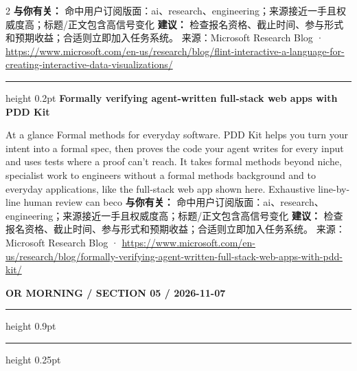 \documentclass[10.5pt]{ctexart}
\begin{document}
\begin{multicols}{2}
\textbf{与你有关：} 命中用户订阅版面：ai、research、engineering；来源接近一手且权威度高；标题/正文包含高信号变化
\textbf{建议：} 检查报名资格、截止时间、参与形式和预期收益；合适则立即加入任务系统。
{\footnotesize\color{ormuted} 来源：Microsoft Research Blog · \url{https://www.microsoft.com/en-us/research/blog/flint-interactive-a-language-for-creating-interactive-data-visualizations/}}
\vspace{2mm}
\hrule height 0.2pt
\vspace{2mm}
{\large\bfseries Formally verifying agent-written full-stack web apps with PDD Kit}\par
At a glance Formal methods for everyday software. PDD Kit helps you turn your intent into a formal spec, then proves the code your agent writes for every input and uses tests where a proof can’t reach. It takes formal methods beyond niche, specialist work to engineers without a formal methods background and to everyday applications, like the full-stack web app shown here. Exhaustive line-by-line human review can beco
\textbf{与你有关：} 命中用户订阅版面：ai、research、engineering；来源接近一手且权威度高；标题/正文包含高信号变化
\textbf{建议：} 检查报名资格、截止时间、参与形式和预期收益；合适则立即加入任务系统。
{\footnotesize\color{ormuted} 来源：Microsoft Research Blog · \url{https://www.microsoft.com/en-us/research/blog/formally-verifying-agent-written-full-stack-web-apps-with-pdd-kit/}}
\end{multicols}
\newpage
{\small\bfseries OR MORNING / SECTION 05 / 2026-11-07}
\vspace{2mm}
\hrule height 0.9pt
\vspace{1.5mm}
\hrule height 0.25pt
\vspace{4mm}
\end{document}
